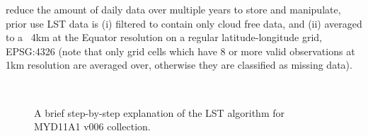 \documentclass[hess, twostagejnl]{copernicus}
\begin{document}
reduce the amount of daily data over multiple years to store and manipulate, prior use LST data is (i) filtered to contain only cloud free data, and (ii) averaged to a ~4km at the Equator resolution on a regular latitude-longitude grid, EPSG:4326 (note that only grid cells which have 8 or more valid observations at 1km resolution are averaged over, otherwise they are classified as missing data).

\begin{figure}
	 \\
	\caption{A brief step-by-step explanation of the LST algorithm for MYD11A1 v006 collection.} 
	\label{fig:example_figure_c}
\end{figure}
\end{document}
